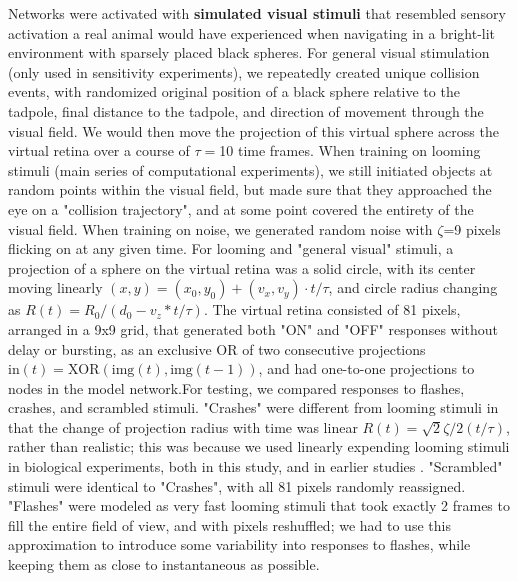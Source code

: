 \documentclass{article}
\begin{document}
Networks were activated with \textbf{simulated visual stimuli} that resembled sensory activation a real animal would have experienced when navigating in a bright-lit environment with sparsely placed black spheres. For general visual stimulation (only used in sensitivity experiments), we repeatedly created unique collision events, with randomized original position of a black sphere relative to the tadpole, final distance to the tadpole, and direction of movement through the visual field. We would then move the projection of this virtual sphere across the virtual retina over a course of $\tau=$10 time frames.  When training on looming stimuli (main series of computational experiments), we still initiated objects at random points within the visual field, but made sure that they approached the eye on a "collision trajectory", and at some point covered the entirety of the visual field. When training on noise, we generated random noise with $\zeta$=9 pixels flicking on at any given time. For looming and "general visual" stimuli, a projection of a sphere on the virtual retina was a solid circle, with its center moving linearly $(x,y) = (x_0,y_0)+(v_x,v_y)\cdot t/\tau$, and circle radius changing as $R(t) = R_0/(d_0 - v_z*t/\tau)$. The virtual retina consisted of 81 pixels, arranged in a 9x9 grid, that generated both "ON" and "OFF" responses without delay or bursting, as an exclusive OR of two consecutive projections $\text{in}(t) = \text{XOR}(\text{img}(t),\text{img}(t-1))$, and had one-to-one projections to nodes in the model network.For testing, we compared responses to flashes, crashes, and scrambled stimuli. "Crashes" were different from looming stimuli in that the change of projection radius with time was linear $R(t) = \sqrt{2}\zeta/2(t/\tau)$, rather than realistic; this was because we used linearly expending looming stimuli in biological experiments, both in this study, and in earlier studies \citep{khakhalin2014}. "Scrambled" stimuli were identical to "Crashes", with all 81 pixels randomly reassigned. "Flashes" were modeled as very fast looming stimuli that took exactly 2 frames to fill the entire field of view, and with pixels reshuffled; we had to use this approximation to introduce some variability into responses to flashes, while keeping them as close to instantaneous as possible.
\end{document}
